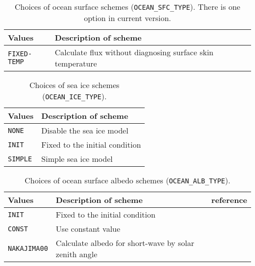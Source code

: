 \begin{table}[h]
\begin{center}
  \caption{Choices of ocean surface schemes (\texttt{OCEAN\_SFC\_TYPE}). There is one option in current version.}
  \label{tab:nml_ocean_sfc}
  \begin{tabularx}{150mm}{lX} \hline
    \rowcolor[gray]{0.9}  Values & Description of scheme \\ \hline
      \verb|FIXED-TEMP| & Calculate flux without diagnosing surface skin temperature \\
    \hline
  \end{tabularx}
\end{center}
\end{table}

\begin{table}[h]
\begin{center}
  \caption{Choices of sea ice schemes (\texttt{OCEAN\_ICE\_TYPE}).}
  \label{tab:nml_ocean_ice}
  \begin{tabularx}{150mm}{lX} \hline
    \rowcolor[gray]{0.9}  Values & Description of scheme \\ \hline
      \verb|NONE|   & Disable the sea ice model \\
      \verb|INIT|   & Fixed to the initial condition \\
      \verb|SIMPLE| & Simple sea ice model \\
    \hline
  \end{tabularx}
\end{center}
\end{table}

\begin{table}[h]
\begin{center}
  \caption{Choices of ocean surface albedo schemes (\texttt{OCEAN\_ALB\_TYPE}).}
  \label{tab:nml_ocean_alb}
  \begin{tabularx}{150mm}{llX} \hline
    \rowcolor[gray]{0.9}  Values & Description of scheme & reference \\ \hline
      \verb|INIT|       & Fixed to the initial condition \\
      \verb|CONST|      & Use constant value \\
      \verb|NAKAJIMA00| & Calculate albedo for short-wave by solar zenith angle & \citet{nakajima_2000} \\
    \hline
  \end{tabularx}
\end{center}
\end{table}

